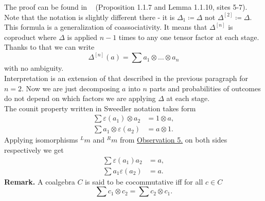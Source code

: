 \documentclass[a4paper, 12pt]{article}
\begin{document}
The proof can be found in ~\cite{DNR} (Proposition 1.1.7 and Lemma 1.1.10, sites 5-7). Note that the
notation is slightly different there - it is $\Delta_1 \coloneqq \Delta$ not $\Delta^{[2]} \coloneqq
 \Delta$. \\
This formula is a generalization of coassociativity. It means that $\Delta^{[n]}$ is coproduct where
$\Delta$ is applied $n-1$ times to any one tensor factor at each stage. Thanks to that we can write
\begin{equation*}
\Delta^{[n]}(a) = \sum a_1 \otimes \dots \otimes a_n
\end{equation*}
with no ambiguity. \\
Interpretation is an extension of that described in the previous paragraph for $n = 2$. Now we are just
decomposing $a$ into $n$ parts and probabilities of outcomes do not depend on which factors we are
applying $\Delta$ at each stage.  \\[8pt]
The counit property written in Sweedler notation takes form
\begin{align*}
\sum\varepsilon(a_1) \otimes a_2 &= 1 \otimes a, \\
\sum a_1 \otimes \varepsilon(a_2) &= a \otimes 1.
\end{align*}
Applying isomorphisms ${^Lm}$ and ${^Rm}$ from
\hyperref[observation:5]{Observation 5.} on both sides respectively we get
\begin{align*}
\sum\varepsilon(a_1)a_2 &= a, \\
\sum a_1\varepsilon(a_2) &= a.
\end{align*}
\textbf{Remark. } A coalgebra $C$ is said to be cocommutative iff for all $c \in C$
\begin{equation*}
\sum c_1 \otimes c_2 = \sum c_2 \otimes c_1.
\end{equation*}
\end{document}
